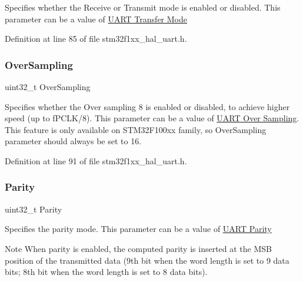 Specifies whether the Receive or Transmit mode is enabled or disabled. This parameter can be a value of \hyperlink{group___u_a_r_t___mode}{U\+A\+RT Transfer Mode} 

Definition at line 85 of file stm32f1xx\+\_\+hal\+\_\+uart.\+h.

\mbox{\label{struct_u_a_r_t___init_type_def_a35770b237370fda7fd0fabad22898490}} 
\subsubsection{\texorpdfstring{Over\+Sampling}{OverSampling}}
{\footnotesize\ttfamily uint32\+\_\+t Over\+Sampling}

Specifies whether the Over sampling 8 is enabled or disabled, to achieve higher speed (up to f\+P\+C\+L\+K/8). This parameter can be a value of \hyperlink{group___u_a_r_t___over___sampling}{U\+A\+RT Over Sampling}. This feature is only available on S\+T\+M32\+F100xx family, so Over\+Sampling parameter should always be set to 16. 

Definition at line 91 of file stm32f1xx\+\_\+hal\+\_\+uart.\+h.

\mbox{\label{struct_u_a_r_t___init_type_def_a1d60a99b8f3965f01ab23444b154ba79}} 
\subsubsection{\texorpdfstring{Parity}{Parity}}
{\footnotesize\ttfamily uint32\+\_\+t Parity}

Specifies the parity mode. This parameter can be a value of \hyperlink{group___u_a_r_t___parity}{U\+A\+RT Parity} \begin{DoxyNote}{Note}
When parity is enabled, the computed parity is inserted at the M\+SB position of the transmitted data (9th bit when the word length is set to 9 data bits; 8th bit when the word length is set to 8 data bits). 
\end{DoxyNote}



